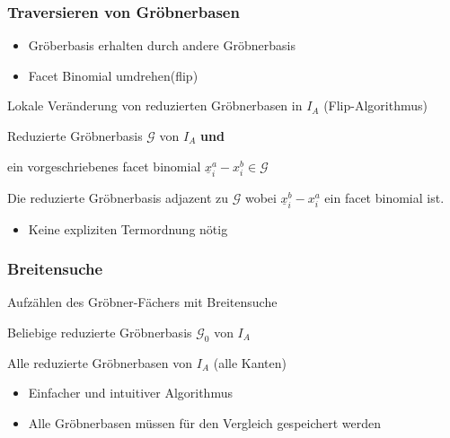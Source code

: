 \documentclass{beamer}
\newcommand{\Input}{\item[\algorithmicinput]}
\newcommand{\algorithmicinput}{\textbf{Input:}}
\newcommand{\Output}{\item[\algorithmicoutput]}
\newcommand{\algorithmicoutput}{\textbf{Output:}}
\begin{document}
\begin{frame}
\frametitle{Traversieren von Gröbnerbasen}
\begin{itemize}
\item Gröberbasis erhalten durch andere Gröbnerbasis
\item Facet Binomial \glqq umdrehen\grqq (flip)
\end{itemize}


\begin{algorithm}[H]
\caption{Lokale Veränderung von reduzierten Gröbnerbasen in $I_A$ (Flip-Algorithmus) }
\label{alg:flip}
\begin{algorithmic}[1]

\Input
Reduzierte Gröbnerbasis $ \mathcal{G} $ von $I_A$ \textbf{und}

ein vorgeschriebenes facet binomial    $ \underline{x}^{a}_{i} - x^{b}_{i} \in \mathcal{G} $  
\Output Die reduzierte Gröbnerbasis adjazent zu $\mathcal{G}$ wobei $ \underline{x}^{b}_{i} - x^{a}_{i} $ ein facet binomial ist.

\end{algorithmic}
\end{algorithm}

\begin{itemize}
\item Keine expliziten Termordnung nötig

\end{itemize}

	
\end{frame}


\begin{frame}[fragile]
\frametitle{Breitensuche}


\begin{algorithm}[H]
\caption{Aufzählen des Gröbner-Fächers mit Breitensuche}
\label{alg:breath}
\begin{algorithmic}[1]

\Input
Beliebige reduzierte Gröbnerbasis $ \mathcal{G}_0 $ von $I_A$
\Output
Alle reduzierte Gröbnerbasen von $I_A$ (alle Kanten)

\end{algorithmic}
\end{algorithm}

\begin{itemize}
\item Einfacher und intuitiver Algorithmus
\item Alle Gröbnerbasen müssen für den Vergleich gespeichert werden
\end{itemize}
 
\end{frame}
\end{document}
